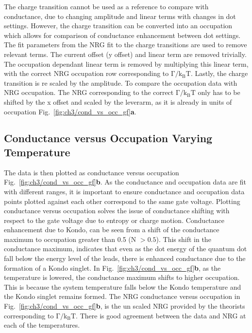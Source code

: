 The charge transition cannot be used as a reference to compare with conductance, due to changing amplitude and linear terms with changes in dot settings. However, the charge transition can be converted into an occupation which allows for comparison of conductance enhancement between dot settings. The fit parameters from the NRG fit to the charge transitions are used to remove relevant terms. The current offset (y offset) and linear term are removed trivially. The occupation dependant linear term is removed by multiplying this linear term, with the correct NRG occupation row corresponding to $\mathrm{\Gamma/k_BT}$. Lastly, the charge transition is re scaled by the amplitude. To compare the occupation data with NRG occupation. The NRG corresponding to the correct $\mathrm{\Gamma/k_BT}$ only has to be shifted by the x offset and scaled by the leverarm, as it is already in units of occupation Fig.~\ref{fig:ch3/cond_vs_occ_gf}\textbf{a}.


\subsection{Conductance versus Occupation Varying Temperature}
The data is then plotted as conductance versus occupation Fig.~\ref{fig:ch3/cond_vs_occ_gf}\textbf{b}. As the conductance and occupation data are fit with different ranges, it is important to ensure conductance and occupation data points plotted against each other correspond to the same gate voltage. Plotting conductance versus occupation solves the issue of conductance shifting with respect to the gate voltage due to entropy or charge motion. Conductance enhancement due to Kondo, can be seen from a shift of the conductance maximum to occupation greater than 0.5 (N $>0.5$). This shift in the conductance maximum, indicates that even as the dot energy of the quantum dot fall below the energy level of the leads, there is enhanced conductance due to the formation of a Kondo singlet. In Fig.~\ref{fig:ch3/cond_vs_occ_gf}\textbf{b}, as the temperature is lowered, the conductance maximum shifts to higher occupation. This is because the system temperature falls below the Kondo temperature and the Kondo singlet remains formed. The NRG conductance versus occupation in Fig.~\ref{fig:ch3/cond_vs_occ_gf}\textbf{b}, is the un scaled NRG provided by the theorists corresponding to $\mathrm{\Gamma/k_BT}$. There is good agreement between the data and NRG at each of the temperatures. 


